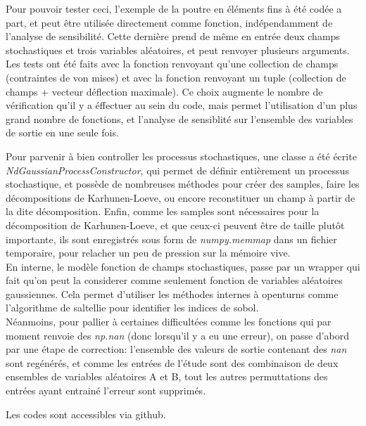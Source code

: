 \documentclass[a4paper,10pt]{article}
\begin{document}
Pour pouvoir tester ceci, l'exemple de la poutre en éléments fins à été codée a part, et peut être utilisée directement comme fonction, indépendamment de l'analyse de sensibilité. Cette dernière prend de même en entrée deux champs stochastiques et trois variables aléatoires, et peut renvoyer plusieurs arguments. Les tests ont été faits avec la fonction renvoyant qu'une collection de champs (contraintes de von mises) et avec la fonction renvoyant un tuple (collection de champs + vecteur déflection maximale). Ce choix augmente le nombre de vérification qu'il y a éffectuer au sein du code, mais permet l'utilisation d'un plus grand nombre de fonctions, et l'analyse de sensiblité sur l'ensemble des variables de sortie en une seule fois.

Pour parvenir à bien controller les processus stochastiques, une classe a été écrite \textit{NdGaussianProcessConstructor}, qui permet de définir entièrement un processus stochastique, et possède de nombreuses méthodes pour créer des samples, faire les décompositions de Karhunen-Loeve, ou encore reconstituer un champ à partir de la dite décomposition. Enfin, comme les samples sont nécessaires pour la décomposition de Karhunen-Loeve, et que ceux-ci peuvent être de taille plutôt importante, ils sont enregistrés sous form de \textit{numpy.memmap} dans un fichier temporaire, pour relacher un peu de pression sur la mémoire vive.\\

En interne, le modèle fonction de champs stochastiques, passe par un wrapper qui fait qu'on peut la considerer comme seulement fonction de variables aléatoires gaussiennes. Cela permet d'utiliser les méthodes internes à openturns comme l'algorithme de saltellie pour identifier les indices de sobol. \\

Néanmoins, pour pallier à certaines difficultées comme les fonctions qui par moment renvoie des \textit{np.nan} (donc lorsqu'il y a eu une erreur), on passe d'abord par une étape de correction:  l'ensemble des valeurs de sortie contenant des \textit{nan} sont regénérés, et comme les entrées de l'étude sont des combinaison de deux ensembles de variables aléatoires A et B, tout les autres permuttations des entrées ayant entrainé l'erreur sont supprimés. \

Les codes sont accessibles via github.\\
\end{document}
